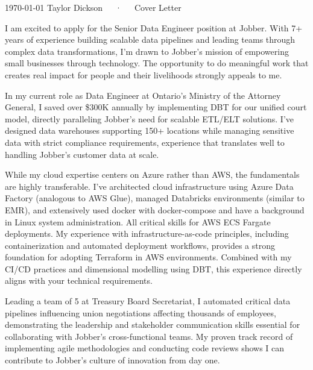 \documentclass[11pt, letterpaper]{awesome-cv}
\begin{document}
\makecvheader[R]

\makecvfooter%
  {\today}
  {Taylor Dickson~~~·~~~Cover Letter}
  {}

\makelettertitle%

\begin{cvletter}
I am excited to apply for the Senior Data Engineer position at Jobber. With 7+ years of experience building scalable data pipelines and leading teams through complex data transformations, I'm drawn to Jobber's mission of empowering small businesses through technology. The opportunity to do meaningful work that creates real impact for people and their livelihoods strongly appeals to me.

In my current role as Data Engineer at Ontario's Ministry of the Attorney General, I saved over \$300K annually by implementing DBT for our unified court model, directly paralleling Jobber's need for scalable ETL/ELT solutions. I've designed data warehouses supporting 150+ locations while managing sensitive data with strict compliance requirements, experience that translates well to handling Jobber's customer data at scale.

While my cloud expertise centers on Azure rather than AWS, the fundamentals are highly transferable. I've architected cloud infrastructure using Azure Data Factory (analogous to AWS Glue), managed Databricks environments (similar to EMR), and extensively used docker with docker-compose and have a background in Linux system administration. All critical skills for AWS ECS Fargate deployments. My experience with infrastructure-as-code principles, including containerization and automated deployment workflows, provides a strong foundation for adopting Terraform in AWS environments. Combined with my CI/CD practices and dimensional modelling using DBT, this experience directly aligns with your technical requirements.

Leading a team of 5 at Treasury Board Secretariat, I automated critical data pipelines influencing union negotiations affecting thousands of employees, demonstrating the leadership and stakeholder communication skills essential for collaborating with Jobber's cross-functional teams. My proven track record of implementing agile methodologies and conducting code reviews shows I can contribute to Jobber's culture of innovation from day one.


\end{cvletter}
\end{document}
